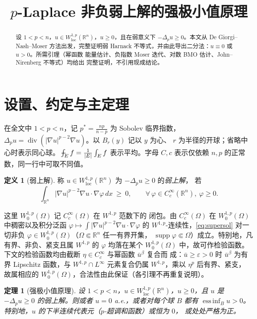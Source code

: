 \documentclass[11pt]{ctexart}
\title{$p$-Laplace 非负弱上解的强极小值原理}
\author{}
\date{}
\newcommand{\fint}{\,\rlap{$-$}\!\int}
\newcommand{\R}{\mathbb{R}}
\DeclareMathOperator*{\essinf}{ess\,inf}
\DeclareMathOperator{\dv}{div}
\DeclareMathOperator{\supp}{supp}
\newcommand{\ub}{\bar{u}}
\newcommand{\eps}{\varepsilon}
\theoremstyle{plain}
\newtheorem{theorem}{定理}
\theoremstyle{definition}
\newtheorem{definition}{定义}
\begin{document}
\maketitle

\begin{abstract}
设 $1<p<n$，$u\in W^{1,p}_{\mathrm{loc}}(\R^n)$，$u\ge0$，且在弱意义下
$-\Delta_p u\ge0$。本文从 De Giorgi--Nash--Moser 方法出发，完整证明弱
Harnack 不等式，并由此导出二分法：$u\equiv0$ 或 $u>0$。所需引理（幂函数
能量估计、负指数 Moser 迭代、对数 BMO 估计、John--Nirenberg 不等式）均给出
完整证明，不引用现成结论。
\end{abstract}

\section{设置、约定与主定理}

在全文中 $1<p<n$，记 $p^*=\frac{np}{n-p}$ 为 Sobolev 临界指数，
$\Delta_p u=\dv(|\nabla u|^{p-2}\nabla u)$。以 $B_r(y)$ 记以 $y$ 为心、
$r$ 为半径的开球；省略中心时表示同心球。$\fint_E f=\frac1{|E|}\int_E f$
表示平均。字母 $C,c$ 表示仅依赖 $n,p$ 的正常数，同一行中可取不同值。

\begin{definition}[弱上解]
称 $u\in W^{1,p}_{\mathrm{loc}}(\R^n)$ 为 $-\Delta_p u\ge0$ 的\emph{弱上解}，
若
\begin{equation}\label{eq:supersol}
\int_{\R^n}|\nabla u|^{p-2}\nabla u\cdot\nabla\varphi\,dx\ \ge\ 0,
\qquad \forall\,\varphi\in C_c^\infty(\R^n),\ \varphi\ge0.
\end{equation}
\end{definition}

这里 $W_0^{1,p}(\Omega)$ 记 $C_c^\infty(\Omega)$ 在 $W^{1,p}$ 范数下的
闭包。由 $C_c^\infty(\Omega)$ 在 $W_0^{1,p}(\Omega)$ 中稠密以及积分泛函
$\varphi\mapsto\int|\nabla u|^{p-2}\nabla u\cdot\nabla\varphi$ 的
$W^{1,p}$-连续性，\eqref{eq:supersol} 对一切非负
$\varphi\in W_0^{1,p}(\Omega)$（$\Omega\Subset\R^n$ 任一有界开集，
$\supp\varphi\Subset\Omega$）成立。特别地，凡有界、非负、紧支且属
$W^{1,p}$ 的 $\varphi$ 均落在某个 $W_0^{1,p}(\Omega)$ 中，故可作检验函数。
下文的检验函数均由截断 $\eta\in C_c^\infty$ 与幂函数 $\ub^{\beta}$ 复合而
成：$\ub\ge\eps>0$ 时 $\ub^\beta$ 为有界 Lipschitz 函数，与
$W^{1,p}\cap L^\infty$ 元素复合仍属 $W^{1,p}$，乘以 $\eta^p$ 后有界、紧支，
故属相应的 $W_0^{1,p}(\Omega)$，合法性由此保证（各引理不再重复说明）。

\begin{theorem}[强极小值原理]\label{thm:main}
设 $1<p<n$，$u\in W^{1,p}_{\mathrm{loc}}(\R^n)$，$u\ge0$，且 $u$ 是
$-\Delta_p u\ge0$ 的弱上解。则或者 $u=0$ a.e.，或者对每个球 $B$ 都有
$\essinf_B u>0$。特别地，$u$ 的下半连续代表元（$p$-超调和函数）或恒为 $0$，
或处处严格为正。
\end{theorem}
\end{document}
